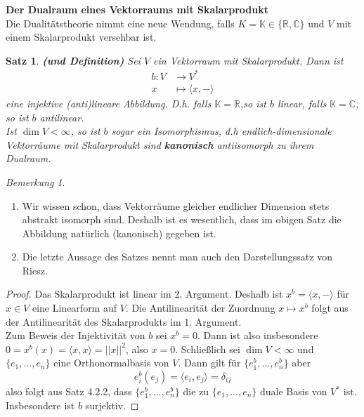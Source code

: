 \documentclass[12pt,a4paper]{article}
\newtheorem{theorem}{Satz}
\theoremstyle{definition}
\theoremstyle{remark}
\newtheorem*{remark}{Bemerkung}
\begin{document}
	\textbf{Der Dualraum eines Vektorraums mit Skalarprodukt} \\
	Die Dualitätstheorie nimmt eine neue Wendung, falls $K = \mathbb{K} \in \{ \mathbb{R}, \mathbb{C} \}$ und $V$ mit einem Skalarprodukt versehbar ist.
	\begin{theorem}{\textbf{(und Definition)}}
		Sei $V$ ein Vektorraum mit Skalarprodukt. Dann ist 
		\begin{equation}
			\begin{split}
				b : V &\rightarrow V^* \\
				x &\mapsto \langle x, - \rangle
			\end{split} 
		\end{equation}
		eine injektive (anti)lineare Abbildung. D.h. falls $\mathbb{K}=\mathbb{R}$,so ist $b$ linear, falls $\mathbb{K}=\mathbb{C}$, so ist $b$ antilinear. \\
		Ist $\dim V < \infty$, so ist $b$ sogar ein Isomorphismus, d.h endlich-dimensionale Vektorräume mit Skalarprodukt sind \textbf{kanonisch} antiisomorph zu ihrem Dualraum.
	\end{theorem}
	\begin{remark}
		\begin{enumerate}
			\item 	
				Wir wissen schon, dass Vektorräume gleicher endlicher Dimension stets abstrakt isomorph sind. Deshalb ist es wesentlich, dass im obigen Satz die Abbildung natürlich (kanonisch) gegeben ist.
			\item 	
				Die letzte Aussage des Satzes nennt man auch den Darstellungssatz von Riesz.
		\end{enumerate}
	\end{remark}
	\begin{proof}
		Das Skalarprodukt ist linear im 2. Argument. Deshalb ist $x^b = \langle x,-\rangle$ für $x \in V$ eine Linearform auf $V$. Die Antilinearität der Zuordnung $x \mapsto x^b$ folgt aus der Antilinearität des Skalarprodukts im 1. Argument. \\
		Zum Beweis der Injektivität von $b$ sei $x^b = 0$. Dann ist also insbesondere $0 = x^b(x) = \langle x,x \rangle = ||x||^2$, also $x = 0$. Schließlich sei $\dim V < \infty$ und $\{ e_1,...,e_n \}$ eine Orthonormalbasis von $V$. Dann gilt für $\{ e_1^b,...,e_n^b \}$ aber
		\begin{equation}
			e_i^b(e_j) = \langle e_i, e_j \rangle = \delta_{ij}
		\end{equation}
		also folgt aus Satz 4.2.2, dass $\{ e_1^b,...,e_n^b \}$ die zu $\{ e_1,...,e_n \}$ duale Basis von $V^*$ ist. Insbesondere ist $b$ surjektiv.
	\end{proof}
\end{document}
